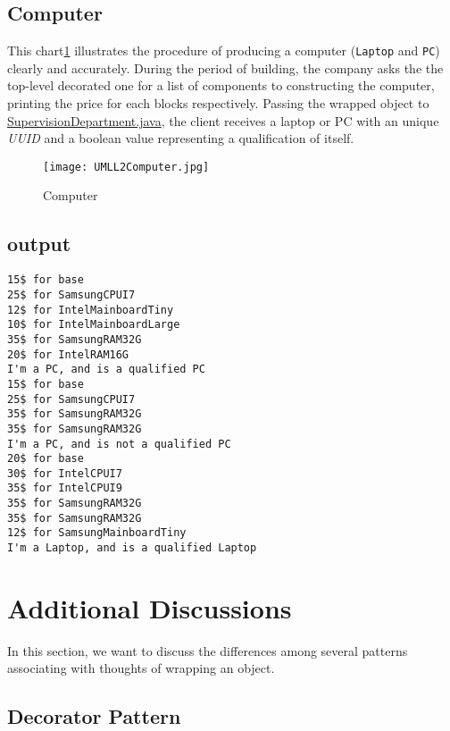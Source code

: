 \documentclass[a4paper]{article}
\begin{document}
\subsection{Computer}%
\label{sub:computer}

This chart\ref{fig:computer} illustrates the procedure of producing
a computer (\texttt{Laptop} and \texttt{PC}) clearly and accurately.
During the period of building, the company asks the the top-level decorated
one for a list of components to constructing the computer, printing the
price for each blocks respectively. Passing the wrapped object to
\underline{SupervisionDepartment.java}, the client receives a laptop
or PC with an unique \textsl{UUID} and a boolean value representing
a qualification of itself.

\begin{figure}[h]
    \centering
    \texttt{[image: UMLL2Computer.jpg]}
    \caption{Computer}
    \label{fig:computer}
\end{figure}

\newpage

\subsection{output}%
\label{sub:output}

\begin{lstlisting}
15$ for base
25$ for SamsungCPUI7
12$ for IntelMainboardTiny
10$ for IntelMainboardLarge
35$ for SamsungRAM32G
20$ for IntelRAM16G
I'm a PC, and is a qualified PC
15$ for base
25$ for SamsungCPUI7
35$ for SamsungRAM32G
35$ for SamsungRAM32G
I'm a PC, and is not a qualified PC
20$ for base
30$ for IntelCPUI7
35$ for IntelCPUI9
35$ for SamsungRAM32G
35$ for SamsungRAM32G
12$ for SamsungMainboardTiny
I'm a Laptop, and is a qualified Laptop
\end{lstlisting}

\section{Additional Discussions}%
\label{sec:additional_discussions}

In this section, we want to discuss the differences among several patterns
associating with thoughts of wrapping an object.

\subsection{Decorator Pattern}%
\label{sub:decorator_pattern}
\end{document}
